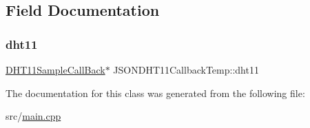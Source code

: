 \subsection{Field Documentation}
\mbox{\label{classJSONDHT11CallbackTemp_aed9fd605ded1a4cf2b9d5b4bdf5071be}} 
\subsubsection{\texorpdfstring{dht11}{dht11}}
{\footnotesize\ttfamily \hyperlink{classDHT11SampleCallBack}{D\+H\+T11\+Sample\+Call\+Back}$\ast$ J\+S\+O\+N\+D\+H\+T11\+Callback\+Temp\+::dht11\hspace{0.3cm}{\ttfamily [private]}}



The documentation for this class was generated from the following file\+:\begin{DoxyCompactItemize}
\item 
src/\hyperlink{main_8cpp}{main.\+cpp}\end{DoxyCompactItemize}
